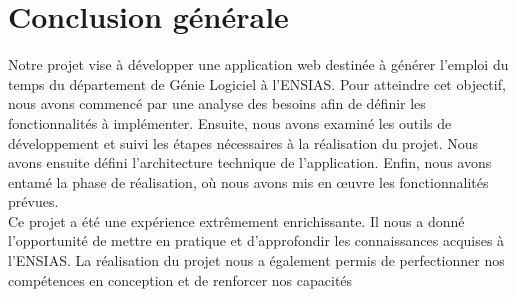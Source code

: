 \chapter*{Conclusion générale}




\label{chap:General Conclusion} 

Notre projet vise à développer une application web destinée à générer l'emploi du temps du département de Génie Logiciel à l'ENSIAS. Pour atteindre cet objectif, nous avons commencé par une analyse des besoins afin de définir les fonctionnalités à implémenter. Ensuite, nous avons examiné les outils de développement et suivi les étapes nécessaires à la réalisation du projet. Nous avons ensuite défini l'architecture technique de l'application. Enfin, nous avons entamé la phase de réalisation, où nous avons mis en œuvre les fonctionnalités prévues.\\

Ce projet a été une expérience extrêmement enrichissante. Il nous a donné l'opportunité de mettre en pratique et d'approfondir les connaissances acquises à l'ENSIAS. La réalisation du projet nous a également permis de perfectionner nos compétences en conception et de renforcer nos capacités%
